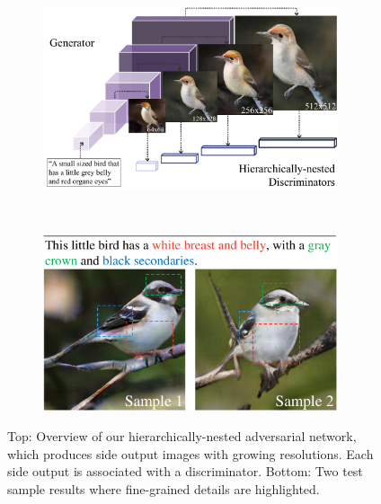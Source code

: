 \documentclass[10pt,twocolumn,letterpaper]{article}
\begin{document}
\begin{figure}[t]
    \centering
    \begin{subfigure}[t]{0.5\textwidth}
        \includegraphics[width=0.95\textwidth]{figure/intro2.pdf}
    \end{subfigure} \\
\centering
    \begin{subfigure}[t]{0.5\textwidth}
        \includegraphics[width=0.95\textwidth,height=0.55\textwidth]{figure/single_view.pdf}
    \end{subfigure}
    \vspace{-.6cm}
    \caption{Top: Overview of our hierarchically-nested adversarial network, which produces side output images with growing resolutions. Each side output is associated with a discriminator. Bottom: Two test sample results where fine-grained details are highlighted. \label{fig:intro}}     
    \vspace{-.5cm}
\end{figure}
\end{document}
